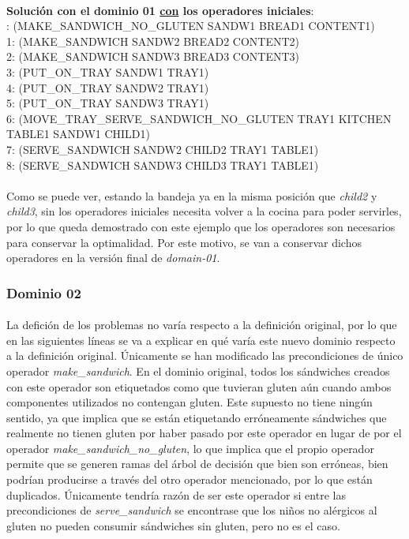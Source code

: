 \documentclass{article}
\begin{document}
\paragraph{}
\textbf{Solución con el dominio 01 \underline{con} los operadores iniciales}: \\
: (MAKE\_SANDWICH\_NO\_GLUTEN SANDW1 BREAD1 CONTENT1) \\
1: (MAKE\_SANDWICH SANDW2 BREAD2 CONTENT2) \\
2: (MAKE\_SANDWICH SANDW3 BREAD3 CONTENT3) \\
3: (PUT\_ON\_TRAY SANDW1 TRAY1) \\
4: (PUT\_ON\_TRAY SANDW2 TRAY1) \\
5: (PUT\_ON\_TRAY SANDW3 TRAY1) \\
6: (MOVE\_TRAY\_SERVE\_SANDWICH\_NO\_GLUTEN TRAY1 KITCHEN TABLE1 SANDW1 CHILD1) \\
7: (SERVE\_SANDWICH SANDW2 CHILD2 TRAY1 TABLE1) \\
8: (SERVE\_SANDWICH SANDW3 CHILD3 TRAY1 TABLE1) \\

\paragraph{}
Como se puede ver, estando la bandeja ya en la misma posición que \textit{child2} y \textit{child3}, sin los operadores iniciales necesita volver a la cocina para poder servirles, por lo que queda demostrado con este ejemplo que los operadores son necesarios para conservar la optimalidad. Por este motivo, se van a conservar dichos operadores en la versión final de \textit{domain-01}.

\subsubsection{Dominio 02}

\paragraph{}
La defición de los problemas no varía respecto a la definición original, por lo que en las siguientes líneas se va a explicar en qué varía este nuevo dominio respecto a la definición original. Únicamente se han modificado las precondiciones de único operador \textit{make\_sandwich}. En el dominio original, todos los sándwiches creados con este operador son etiquetados como que tuvieran gluten aún cuando ambos componentes utilizados no contengan gluten. Este supuesto no tiene ningún sentido, ya que implica que se están etiquetando erróneamente sándwiches que realmente no tienen gluten por haber pasado por este operador en lugar de por el operador \textit{make\_sandwich\_no\_gluten}, lo que implica que el propio operador permite que se generen ramas del árbol de decisión que bien son erróneas, bien podrían producirse a través del otro operador mencionado, por lo que están duplicados. Únicamente tendría razón de ser este operador si entre las precondiciones de \textit{serve\_sandwich} se encontrase que los niños no alérgicos al gluten no pueden consumir sándwiches sin gluten, pero no es el caso.
\end{document}

